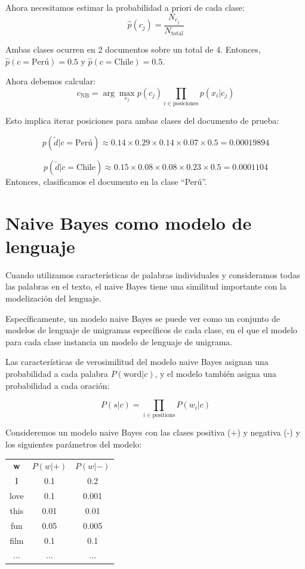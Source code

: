 \documentclass[11pt,fleqn]{book} %
\begin{document}
Ahora necesitamos estimar la probabilidad a priori de cada clase:
    \[
    \hat{p}(c_j) = \frac{N_{c_j}}{N_{\text{total}}}
    \]

Ambas clases ocurren en 2 documentos sobre un total de 4. Entonces, $\hat{p}(c=\text{Perú})=0.5$ y $\hat{p}(c=\text{Chile})=0.5$.

Ahora debemos calcular:
\[
c_{\text{NB}} = \arg\max_{c_j} p(c_j) \prod_{i \in \text{posiciones}} p(x_i | c_j)
\]

Esto implica iterar posiciones para ambas clases del documento de prueba:

\[
p(\tilde{d}|c=\text{Perú})\approx 0.14\times 0.29\times 0.14\times 0.07\times 0.5=0.00019894
\]

\[
p(\tilde{d}|c=\text{Chile})\approx 0.15\times 0.08\times 0.08\times 0.23\times 0.5=0.0001104
\]
Entonces, clasificamos el documento en la clase ``Perú''.


\section{Naive Bayes como modelo de lenguaje}

Cuando utilizamos características de palabras individuales y consideramos todas las palabras en el texto, el naive Bayes tiene una similitud importante con la modelización del lenguaje.

Específicamente, un modelo naive Bayes se puede ver como un conjunto de modelos de lenguaje de unigramas específicos de cada clase, en el que el modelo para cada clase instancia un modelo de lenguaje de unigrama.

Las características de verosimilitud del modelo naive Bayes asignan una probabilidad a cada palabra $P(\text{word}|c)$, y el modelo también asigna una probabilidad a cada oración:

\[P(s|c) = \prod_{i\in \text{positions}} P(w_i|c)\]

Consideremos un modelo naive Bayes con las clases positiva (+) y negativa (-) y los siguientes parámetros del modelo:

\begin{center}
\begin{tabular}{ccc}
\textbf{w} & $P(w|+)$ & $P(w|-)$ \\
I & 0.1 & 0.2 \\
love & 0.1 & 0.001 \\
this & 0.01 & 0.01 \\
fun & 0.05 & 0.005 \\
film & 0.1 & 0.1 \\
... & ... & ...
\end{tabular}
\end{center}
\end{document}

